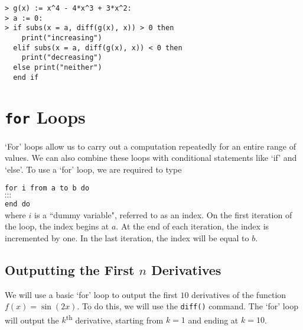 \begin{maplegroup}
\begin{mapleinput}
\begin{verbatim}
> g(x) := x^4 - 4*x^3 + 3*x^2:
> a := 0:
> if subs(x = a, diff(g(x), x)) > 0 then
    print("increasing")
  elif subs(x = a, diff(g(x), x)) < 0 then
    print("decreasing")
  else print("neither")
  end if
\end{verbatim}
\end{mapleinput}
\mapleresult
\begin{maplelatex}
\end{maplelatex}
\end{maplegroup}


\section{\texttt{for} Loops}
\label{sec:for_loops}

`For' loops allow us to carry out a computation repeatedly for an entire range of values. We can also combine these loops with conditional statements like `if' and `else'. To use a `for' loop, we are required to type\\


\texttt{for i from a to b do}\\
\hspace{0.5cm}$\cdots$\\
\hspace{0.5cm}$\cdots$\\
\texttt{end do}\\

\noindent
where $i$ is a ``dummy variable", referred to as an index. On the first iteration of the loop, the index begins at $a$. At the end of each iteration, the index is incremented by one. In the last iteration, the index will be equal to $b$.

\subsection{Outputting the First $n$ Derivatives}

We will use a basic `for' loop to output the first $10$ derivatives of the function $f(x)=\sin(2x)$. To do this, we will use the \texttt{diff()} command. The `for' loop will output the $k$\textsuperscript{th} derivative, starting from $k=1$ and ending at $k=10$.

